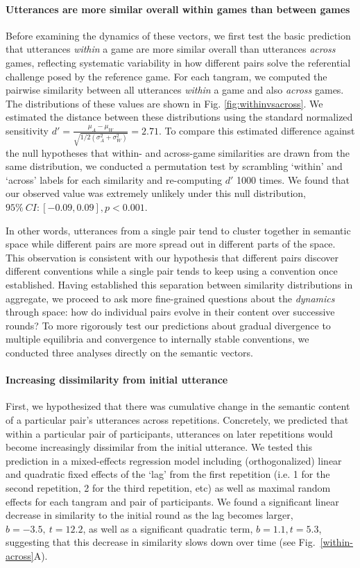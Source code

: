 \documentclass[alpha-refs]{wiley-article}
\begin{document}
\paragraph{Utterances are more similar overall within games than between games}  
Before examining the dynamics of these vectors, we first test the basic prediction that utterances \emph{within} a game are more similar overall than utterances \emph{across} games, reflecting systematic variability in how different pairs solve the referential challenge posed by the reference game.
For each tangram, we computed the pairwise similarity between all utterances \emph{within} a game and also \emph{across} games. 
The distributions of these values are shown in Fig. \ref{fig:withinvsacross}.
We estimated the distance between these distributions using the standard normalized sensitivity $d' = \frac{\mu_A - \mu_W}{\sqrt{1/2(\sigma^2_A+\sigma^2_W)}} = 2.71$.
To compare this estimated difference against the null hypotheses that within- and across-game similarities are drawn from the same distribution, we conducted a permutation test by scrambling `within' and `across' labels for each similarity and re-computing $d'$ 1000 times. 
We found that our observed value was extremely unlikely under this null distribution, $95\%~CI: [-0.09, 0.09], p < 0.001$. 

In other words, utterances from a single pair tend to cluster together in semantic space while different pairs are more spread out in different parts of the space.
This observation is consistent with our hypothesis that different pairs discover different conventions while a single pair tends to keep using a convention once established.
Having established this separation between similarity distributions in aggregate, we proceed to ask more fine-grained questions about the \emph{dynamics} through space: how do individual pairs evolve in their content over successive rounds?
To more rigorously test our predictions about gradual divergence to multiple equilibria and convergence to internally stable conventions, we conducted three analyses directly on the semantic vectors.

\paragraph{Increasing dissimilarity from initial utterance}

First, we hypothesized that there was cumulative change in the semantic content of a particular pair's utterances across repetitions.
Concretely, we predicted that within a particular pair of participants, utterances on later repetitions would become increasingly dissimilar from the initial utterance.
We tested this prediction in a mixed-effects regression model including (orthogonalized) linear and quadratic fixed effects of the `lag' from the first repetition (i.e. 1 for the second repetition, 2 for the third repetition, etc) as well as maximal random effects for each tangram and pair of participants.
We found a significant linear decrease in similarity to the initial round as the lag becomes larger, $b = -3.5,~t = 12.2$, as well as a significant quadratic term, $b=1.1, t=5.3$, suggesting that this decrease in similarity slows down over time (see Fig.~\ref{within-across}A).
\end{document}
